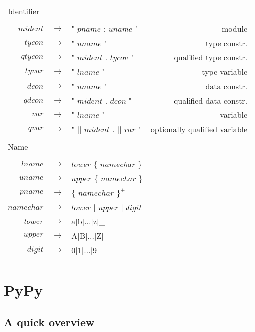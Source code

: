 \documentclass{article}
\begin{document}
\begin{footnotesize}
\begin{longtable}{ r c l r }
\multicolumn{4}{l}{Identifier}			 \\
\\[0.01in]
$mident$	& $ \rightarrow $	& " $pname$ : $uname$ "												& module		\\
$tycon$		& $ \rightarrow $	& " $uname$ "													& type constr.		\\
$qtycon$	& $ \rightarrow $	& " $mident$ . $tycon$ "											& qualified type constr.\\
$tyvar$		& $ \rightarrow $	& " $lname$ "													& type variable		\\
$dcon$		& $ \rightarrow $	& " $uname$ "													& data constr.		\\
$qdcon$		& $ \rightarrow $	& " $mident$ . $dcon$ "												& qualified data constr.\\
$var$		& $ \rightarrow $	& " $lname$ "													& variable		\\
$qvar$		& $ \rightarrow $	& " $||$ $mident$ . $||$ $var$ "										& optionally qualified variable\\
\\[0.01in]

\multicolumn{4}{l}{Name}			 \\
\\[0.01in]
$lname$		& $ \rightarrow $	& $lower$ $\{$ $namechar$ $\}$								& \\
$uname$		& $ \rightarrow $	& $upper$ $\{$ $namechar$ $\}$								& \\
$pname$		& $ \rightarrow $	& $\{$ $namechar$ $\}^{+}$								& \\
$namechar$	& $ \rightarrow $	& $lower$ $|$ $upper$ $|$ $digit$							& \\
$lower$		& $ \rightarrow $	& a$|$b$|$...$|$z$|$\_									& \\
$upper$		& $ \rightarrow $	& A$|$B$|$...$|$Z$|$									& \\
$digit$		& $ \rightarrow $	& 0$|$1$|$...$|$9									& \\
\\[0.01in]

\end{longtable}
\end{footnotesize}

\section{PyPy}

\subsection{A quick overview}
\end{document}
